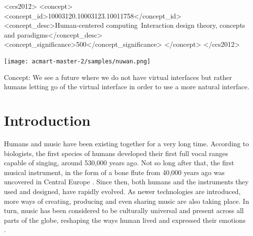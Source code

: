 \documentclass[acmtog]{acmart}
\begin{document}
\begin{CCSXML}
<ccs2012>
   <concept>
       <concept_id>10003120.10003123.10011758</concept_id>
       <concept_desc>Human-centered computing~Interaction design theory, concepts and paradigms</concept_desc>
       <concept_significance>500</concept_significance>
       </concept>
 </ccs2012>
\end{CCSXML}



\begin{teaserfigure}
  \texttt{[image: acmart-master-2/samples/nuwan.png]}
  \caption{Concept: We see a future where we do not have virtual interfaces but rather humans letting go of the virtual interface in order to use a more natural interface.}
  \label{fig:teaser}
\end{teaserfigure}
\maketitle

\section{Introduction}
Humans and music have been existing together for a very long time. According to biologists, the first species of humans developed their first full vocal ranges capable of singing, around 530,000 years ago. Not so long after that, the first musical instrument, in the form of a bone flute from 40,000 years ago was uncovered in Central Europe \cite{higham2012tauesting}. Since then, both humans and the instruments they used and designed, have rapidly evolved. As newer technologies are introduced, more ways of creating, producing and even sharing music \cite{voida2005listening} are also taking place. In turn, music has been considered to be culturally universal \cite{campbell1997music, seeger1971reflections} and present across all parts of the globe, reshaping the ways human lived and expressed their emotions \cite{juslin2001music}.
\end{document}
